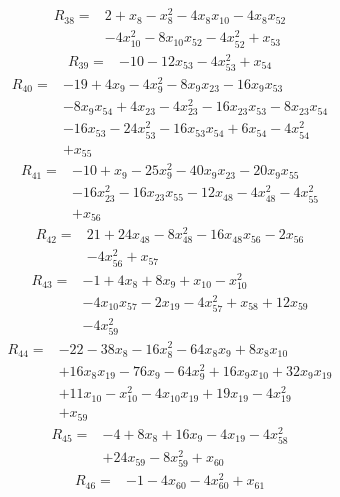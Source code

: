 \begin{align*} R_{38}={}&2 +x_{8} -x_{8}^{2} -4 x_{8}x_{10} -4 x_{8}x_{52}
\\ &-4 x_{10}^{2} -8 x_{10}x_{52} -4 x_{52}^{2} +x_{53}
\end{align*}
\begin{align*} R_{39}={}&-10 -12 x_{53} -4 x_{53}^{2} +x_{54}
\end{align*}
\begin{align*} R_{40}={}&-19 +4 x_{9} -4 x_{9}^{2} -8 x_{9}x_{23} -16 x_{9}x_{53}
\\ &-8 x_{9}x_{54} +4 x_{23} -4 x_{23}^{2} -16 x_{23}x_{53} -8 x_{23}x_{54}
\\ &-16 x_{53} -24 x_{53}^{2} -16 x_{53}x_{54} +6 x_{54} -4 x_{54}^{2}
\\ &+x_{55}
\end{align*}
\begin{align*} R_{41}={}&-10 +x_{9} -25 x_{9}^{2} -40 x_{9}x_{23} -20 x_{9}x_{55}
\\ &-16 x_{23}^{2} -16 x_{23}x_{55} -12 x_{48} -4 x_{48}^{2} -4 x_{55}^{2}
\\ &+x_{56}
\end{align*}
\begin{align*} R_{42}={}&21 +24 x_{48} -8 x_{48}^{2} -16 x_{48}x_{56} -2 x_{56}
\\ &-4 x_{56}^{2} +x_{57}
\end{align*}
\begin{align*} R_{43}={}&-1 +4 x_{8} +8 x_{9} +x_{10} -x_{10}^{2}
\\ &-4 x_{10}x_{57} -2 x_{19} -4 x_{57}^{2} +x_{58} +12 x_{59}
\\ &-4 x_{59}^{2}
\end{align*}
\begin{align*} R_{44}={}&-22 -38 x_{8} -16 x_{8}^{2} -64 x_{8}x_{9} +8 x_{8}x_{10}
\\ &+16 x_{8}x_{19} -76 x_{9} -64 x_{9}^{2} +16 x_{9}x_{10} +32 x_{9}x_{19}
\\ &+11 x_{10} -x_{10}^{2} -4 x_{10}x_{19} +19 x_{19} -4 x_{19}^{2}
\\ &+x_{59}
\end{align*}
\begin{align*} R_{45}={}&-4 +8 x_{8} +16 x_{9} -4 x_{19} -4 x_{58}^{2}
\\ &+24 x_{59} -8 x_{59}^{2} +x_{60}
\end{align*}
\begin{align*} R_{46}={}&-1 -4 x_{60} -4 x_{60}^{2} +x_{61}
\end{align*}
